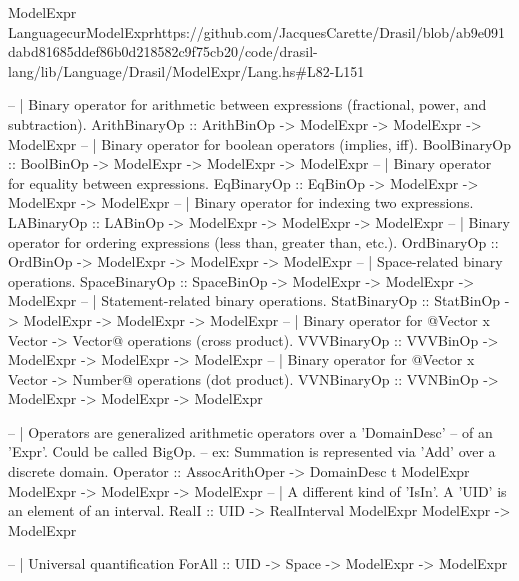 \begin{haskell}{ModelExpr Language}{curModelExpr}{https://github.com/JacquesCarette/Drasil/blob/ab9e091dabd81685ddef86b0d218582c9f75cb20/code/drasil-lang/lib/Language/Drasil/ModelExpr/Lang.hs\#L82-L151}
  
  -- | Binary operator for arithmetic between expressions (fractional, power, and subtraction).
  ArithBinaryOp :: ArithBinOp -> ModelExpr -> ModelExpr -> ModelExpr
  -- | Binary operator for boolean operators (implies, iff).
  BoolBinaryOp  :: BoolBinOp -> ModelExpr -> ModelExpr -> ModelExpr
  -- | Binary operator for equality between expressions.
  EqBinaryOp    :: EqBinOp -> ModelExpr -> ModelExpr -> ModelExpr
  -- | Binary operator for indexing two expressions.
  LABinaryOp    :: LABinOp -> ModelExpr -> ModelExpr -> ModelExpr
  -- | Binary operator for ordering expressions (less than, greater than, etc.).
  OrdBinaryOp   :: OrdBinOp -> ModelExpr -> ModelExpr -> ModelExpr
  -- | Space-related binary operations.
  SpaceBinaryOp :: SpaceBinOp -> ModelExpr -> ModelExpr -> ModelExpr
  -- | Statement-related binary operations.
  StatBinaryOp  :: StatBinOp -> ModelExpr -> ModelExpr -> ModelExpr
  -- | Binary operator for @Vector x Vector -> Vector@ operations (cross product).
  VVVBinaryOp   :: VVVBinOp -> ModelExpr -> ModelExpr -> ModelExpr
  -- | Binary operator for @Vector x Vector -> Number@ operations (dot product).
  VVNBinaryOp   :: VVNBinOp -> ModelExpr -> ModelExpr -> ModelExpr
  
  
  -- | Operators are generalized arithmetic operators over a 'DomainDesc'
  --   of an 'Expr'.  Could be called BigOp.
  --   ex: Summation is represented via 'Add' over a discrete domain.
  Operator :: AssocArithOper -> DomainDesc t ModelExpr ModelExpr -> ModelExpr -> ModelExpr
  -- | A different kind of 'IsIn'. A 'UID' is an element of an interval.
  RealI    :: UID -> RealInterval ModelExpr ModelExpr -> ModelExpr
  
  -- | Universal quantification
  ForAll   :: UID -> Space -> ModelExpr -> ModelExpr
\end{haskell}
